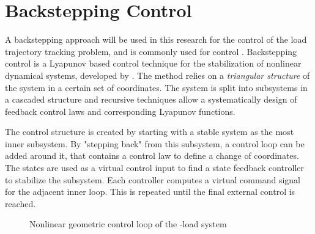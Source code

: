 \newpage
\section{Backstepping Control}\label{sec:con.back}
A backstepping approach will be used in this research for the control of the load trajectory tracking problem, and is commonly used for  control \cite{Mahony2012}. Backstepping control is a Lyapunov based control technique for the stabilization of nonlinear dynamical systems, developed by \cite{Kanellakopoulos1991}. 
The method relies on a \textit{triangular structure} of the system in a certain set of coordinates. The system is split into subsystems in a cascaded structure and recursive techniques allow a systematically design of feedback control laws and corresponding Lyapunov functions.

The control structure is created by starting with a stable system as the most inner subsystem. 
By "stepping back" from this subsystem, a control loop can be added around it, that contains a control law to define a change of coordinates. 
The states are used as a virtual control input to find a state feedback controller to stabilize the subsystem. 
Each controller computes a virtual command signal for the adjacent inner loop. This is repeated until the final external control is reached.

\begin{figure}[h!]
	\centering
	\caption{Nonlinear geometric control loop of the -load system\label{fig:con.loop}}
\end{figure}	

